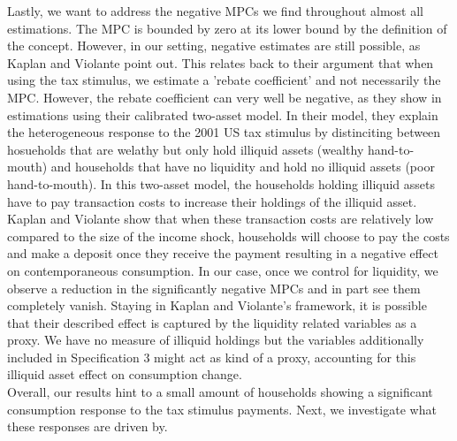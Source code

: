 Lastly, we want to address the negative MPCs we find throughout almost all estimations. The MPC is bounded by zero at its lower bound by the definition of the concept. However, in our setting, negative estimates are still possible, as Kaplan and Violante point out. This relates back to their argument that when using the tax stimulus, we estimate a 'rebate coefficient' and not necessarily the MPC. However, the rebate coefficient can very well be negative, as they show in estimations using their calibrated two-asset model. In their model, they explain the heterogeneous response to the 2001 US tax stimulus by distinciting between hosueholds that are welathy but only hold illiquid assets (wealthy hand-to-mouth) and households that have no liquidity and hold no illiquid assets (poor hand-to-mouth). In this two-asset model, the households holding illiquid assets have to pay transaction costs to increase their holdings of the illiquid asset. Kaplan and Violante show that when these transaction costs are relatively low compared to the size of the income shock, households will choose to pay the costs and make a deposit once they receive the payment resulting in a negative effect on contemporaneous consumption. In our case, once we control for liquidity, we observe a reduction in the significantly negative MPCs and in part see them completely vanish. Staying in Kaplan and Violante's framework, it is possible that their described effect is captured by the liquidity related variables as a proxy. We have no measure of illiquid holdings but the variables additionally included in Specification 3 might act as kind of a proxy, accounting for this illiquid asset effect on consumption change. \\
Overall, our results hint to a small amount of households showing a significant consumption response to the tax stimulus payments. Next, we investigate what these responses are driven by.